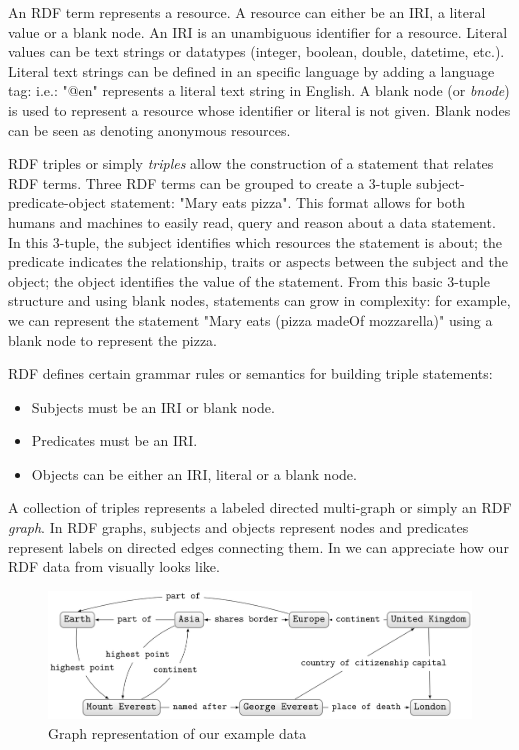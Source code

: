 An RDF term represents a resource. A resource can either be an IRI, a literal value or a blank node. An IRI is an unambiguous identifier for a resource. Literal values can be text strings or datatypes (integer, boolean, double, datetime, etc.). Literal text strings can be defined in an specific language by adding a language tag: i.e.: "@en" represents a literal text string in English. A blank node (or \textit{bnode}) is used to represent a resource whose identifier or literal is not given. Blank nodes can be seen as denoting anonymous resources.

RDF triples or simply \textit{triples} allow the construction of a statement that relates RDF terms. Three RDF terms can be grouped to create a 3-tuple subject-predicate-object statement: "Mary eats pizza". This format allows for both humans and machines to easily read, query and reason about a data statement. 
In this 3-tuple, the subject identifies which resources the statement is about; the predicate indicates the relationship, traits or aspects between the subject and the object; the object identifies the value of the statement. From this basic 3-tuple structure and using blank nodes, statements can grow in complexity: for example, we can represent the statement "Mary eats (pizza madeOf mozzarella)" using a blank node to represent the pizza.

RDF defines certain grammar rules or semantics \cite{RDFSemantics} for building triple statements:
\begin{itemize}
    \item Subjects must be an IRI or blank node.
    \item Predicates must be an IRI.
    \item Objects can be either an IRI, literal or a blank node.
\end{itemize}

A collection of triples represents a labeled directed multi-graph or simply an RDF \textit{graph}. In RDF graphs, subjects and objects represent nodes and predicates represent labels on directed edges connecting them. In  we can appreciate how our RDF data from  visually looks like.

\begin{figure}[h!]
    \centering
        \includegraphics[width=.9\linewidth]{imagenes/exampleGrapha.png}
        \caption{Graph representation of our  example data~\cite{Moreno2018}}
        \label{fig:bobMarleyExampleGraph}
\end{figure}

